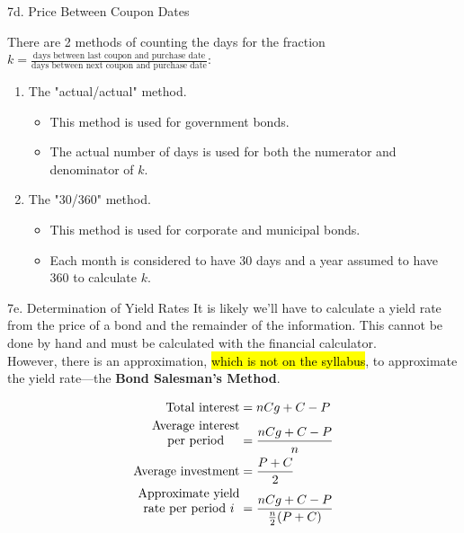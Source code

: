 \begin{CHPT_SUMM_AUTO}[label = {L.-7d}]{7d. Price Between Coupon Dates}
\tcbline

There are 2 methods of counting the days for the fraction $k = \frac{\text{days between last coupon and purchase date}}{\text{days between next coupon and purchase date}}$:
\begin{enumerate}[leftmargin = *]
	\item	The "actual/actual" method.
		\begin{itemize}[leftmargin = *]
		\item	This method is used for government bonds.
		\item	The actual number of days is used for both the numerator and denominator of $k$.
		\end{itemize}
	\item	The "30/360" method.
		\begin{itemize}[leftmargin = *]
		\item	This method is used for corporate and municipal bonds.
		\item	Each month is considered to have 30 days and a year assumed to have 360 to calculate $k$.
		\end{itemize}
\end{enumerate}
\end{CHPT_SUMM_AUTO}

\begin{CHPT_SUMM_AUTO}[label = {L.-7e}]{7e. Determination of Yield Rates}
It is likely we'll have to calculate a yield rate from the price of a bond and the remainder of the information. This cannot be done by hand and must be calculated with the financial calculator. \\
However, there is an approximation, \hl{which is not on the syllabus}, to approximate the yield rate---the \textbf{Bond Salesman's Method}.

\begin{align*}
	\text{Total interest}	
	&=	nCg + C - P	\\
	\text{\shortstack{Average interest\\ per period}}
	&=	\frac{nCg + C - P}{n}	\\
	\text{Average investment}
	&=	\frac{P + C}{2}	\\
	\text{\shortstack{Approximate yield\\ rate per period $i$}}
	&=	\frac{nCg + C - P}{\frac{n}{2}(P + C)}
\end{align*}
\end{CHPT_SUMM_AUTO}

